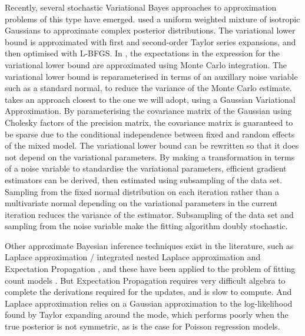 Recently, several stochastic Variational Bayes approaches to approximation
problems of this type have emerged.  \cite{Gershman2012} used a uniform
weighted mixture of isotropic Gaussians to approximate complex posterior
distributions. The variational lower bound is approximated with first and
second-order Taylor series expansions, and then optimised with L-BFGS.  In
\cite{Kingma2013}, the expectations in the expression for the variational lower
bound are approximated using Monte Carlo integration. The variational lower
bound is reparameterised in terms of an auxillary noise variable such as a
standard normal, to reduce the variance of the Monte Carlo estimate.
\cite{Tan2018} takes an approach closest to the one we will adopt, using a
Gaussian Variational Approximation.  By parameterising the covariance matrix of
the Gaussian using Cholesky factors of the precision matrix, the covariance
matrix is guaranteed to be sparse due to the conditional independence between
fixed and random effects of the mixed model. The variational lower bound can be
rewritten so that it does not depend on the variational parameters.  By making
a transformation in terms of a noise variable to standardise the variational
parameters, efficient gradient estimators can be derived, then estimated using
subsampling of the data set. Sampling from the fixed normal distribution on
each iteration rather than a multivariate normal depending on the variational
parameters in the current iteration reduces the variance of the estimator.
Subsampling of the data set and sampling from the noise variable make the
fitting algorithm doubly stochastic.

Other approximate Bayesian inference techniques exist in the literature, such
as Laplace approximation \cite{Tierney1986}/ integrated nested Laplace
approximation \cite{Rue2009} and Expectation Propagation \cite{Minka2013}, and
these have been applied to the problem of fitting count models
\cite{Barber2016} \cite{KimWand2017}.  But Expectation Propagation requires
very difficult algebra to complete the derivations required for the updates,
and is slow to compute. And Laplace approximation relies on a Gaussian
approximation to the log-likelihood found by Taylor expanding around the mode,
which performs poorly when the true posterior is not symmetric, as is the case
for Poisson regression models.

